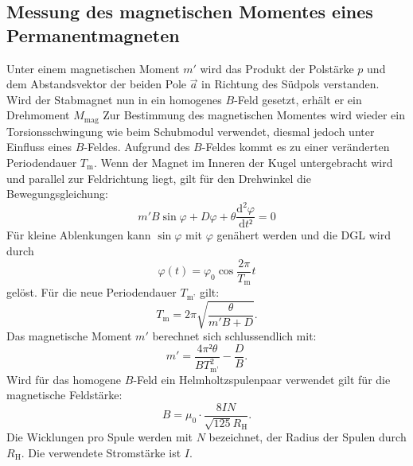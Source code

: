 \subsection{Messung des magnetischen Momentes eines Permanentmagneten}
Unter einem magnetischen Moment $m'$ wird das Produkt der Polstärke $p$
 und dem Abstandsvektor der beiden Pole $\vec{a}$ in Richtung des Südpols verstanden.
  Wird der Stabmagnet nun in ein homogenes $B$-Feld gesetzt,
   erhält er ein Drehmoment $M_{\text{mag}}$
Zur Bestimmung des magnetischen Momentes wird wieder ein Torsionsschwingung wie
 beim Schubmodul verwendet, diesmal jedoch unter Einfluss eines $B$-Feldes.
  Aufgrund des $B$-Feldes kommt es zu einer veränderten Periodendauer $T_\text{m}$.  Wenn
  der Magnet im Inneren der Kugel untergebracht wird und parallel zur Feldrichtung
  liegt, gilt für den Drehwinkel \varphi die Bewegungsgleichung:
  \begin{equation}
    m'B\sin\varphi + D\varphi + \theta\frac{\text{d}^2\varphi}{\text{d}t²} = 0
  \end{equation}
  Für kleine Ablenkungen kann $\sin \varphi$ mit $\varphi$ genähert werden und die DGL wird durch
  \begin{equation}
    \varphi(t) = \varphi_\text{0} \cos\frac{2\pi}{T_\text{m}}t
  \end{equation}
  gelöst. Für die neue Periodendauer $T_\text{m'}$ gilt:
  \begin{equation}
    T_\text{m} = 2\pi\sqrt{\frac{\theta}{m'B + D}}\text{.}
  \end{equation}
Das magnetische Moment $m'$ berechnet sich schlussendlich mit:
\begin{equation}
  m' = \frac{4\pi²\theta}{BT_\text{m'}^2} - \frac{D}{B}\text{.}
\end{equation}
Wird für das homogene $B$-Feld ein Helmholtzspulenpaar verwendet gilt für die
 magnetische Feldstärke:
 \begin{equation}
   B = \mu_0 \cdot \frac{8 I N}{\sqrt{125}R_\text{H}}\text{.}
 \end{equation}
Die Wicklungen pro Spule werden mit $N$ bezeichnet, der Radius der Spulen durch $R_\text{H}$.
 Die verwendete Stromstärke ist $I$.
